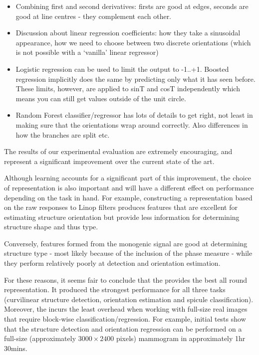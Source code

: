 \label{s:discussion}

\begin{itemize}
\item Combining first and second derivatives: firsts are good at edges, seconds are good at line centres - they complement each other.

\item Discussion about linear regression coefficients: how they take a sinusoidal appearance, how we need to choose between two discrete orientations (which is not possible with a `vanilla' linear regressor)
%

%
\item Logistic regression can be used to limit the output to -1..+1. Boosted regression implicitly does the same by predicting only what it has seen before. These limits, however, are applied to sinT and cosT independently which means you can still get values outside of the unit circle.

\item Random Forest classifier/regressor has lots of details to get right, not least in making sure that the orientations wrap around correctly. Also differences in how the branches are split etc.
\end{itemize}

The results of our experimental evaluation are extremely encouraging, and represent a significant improvement over the current state of the art.

Although learning accounts for a significant part of this improvement, the choice of representation is also important and will have a different effect on performance depending on the task in hand. For example, constructing a representation based on the raw responses to Linop filters produces features that are excellent for estimating structure orientation but provide less information for determining structure shape and thus type.

Conversely, features formed from the monogenic signal are good at determining structure type - most likely because of the inclusion of the phase measure - while they perform relatively poorly at detection and orientation estimation.

For these reasons, it seems fair to conclude that the \dtcwt{} provides the best all round representation. It produced the strongest performance for all three tasks (curvilinear structure detection, orientation estimation and spicule classification). Moreover, the \dtcwt{} incurs the least overhead when working with full-size real images that require block-wise classification/regression. For example, initial tests show that the structure detection and orientation regression can be performed on a full-size (approximately $3000 \times 2400$ pixels) mammogram in approximately 1hr 30mins.

